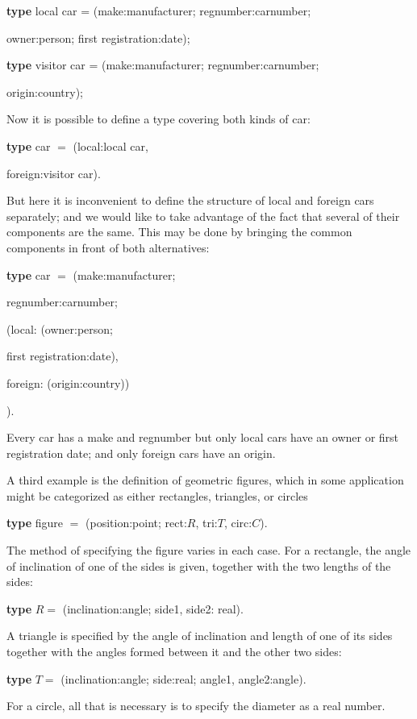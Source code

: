 \quad \textbf{type} local car = (make:manufacturer; regnumber:carnumber;

\tabto{9.4em} owner:person; first registration:date);

\quad \textbf{type} visitor car = (make:manufacturer; regnumber:carnumber;

\tabto{10.1em} origin:country);

Now it is possible to define a type covering both kinds of car:

\quad \textbf{type} car $=$ (local:local car,

\tabto{7.4em} foreign:visitor car).

\noindent
But here it is inconvenient to define the structure of local and foreign cars separately; and we would like to take advantage of the fact that several of their components are the same. This may be done by bringing the common components in front of both alternatives:

\quad \textbf{type} car $=$ (make:manufacturer;

\tabto{7.5em}regnumber:carnumber;

\tabto{7.5em}(local: (owner:person;

\tabto{7.8em}first registration:date),

\tabto{7.8em}foreign: (origin:country))

\tabto{7.1em}).

\noindent
Every car has a make and regnumber but only local cars have an owner or first registration date; and only foreign cars have an origin. 

A third example is the definition of geometric figures, which in some application might be categorized as either rectangles, triangles, or circles

\quad \textbf{type} figure $=$ (position:point; rect:$R$, tri:$T$, circ:$C$).

\noindent
The method of specifying the figure varies in each case. For a rectangle, the angle of inclination of one of the sides is given, together with the two lengths of the sides:

\quad \textbf{type} $R =$ (inclination:angle; side1, side2: real).

\noindent
A triangle is specified by the angle of inclination and length of one of its sides together with the angles formed between it and the other two sides:

\quad \textbf{type} $T =$ (inclination:angle; side:real; angle1, angle2:angle).

\noindent
For a circle, all that is necessary is to specify the diameter as a real number.

